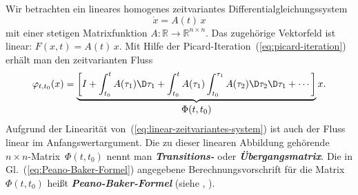 \begin{example}
Wir betrachten ein lineares homogenes zeitvariantes Differentialgleichungssystem
\begin{equation}
\dot{x}=A(t)\,x\label{eq:linear-zeitvariantes-system}
\end{equation}
mit einer stetigen Matrixfunktion $A:\mathbb{R}\to\mathbb{R}^{n\times n}$.
Das zugehörige Vektorfeld ist linear: $F(x,t)=A(t)\,x$. Mit Hilfe
der Picard-Iteration~(\ref{eq:picard-iteration}) erhält man den
zeitvarianten Fluss
\begin{equation}
\varphi_{t,t_{0}}(x)=\underbrace{\left[I+\int_{t_{0}}^{t}A(\tau_{1})\D\tau_{1}+\int_{t_{0}}^{t}A(\tau_{1})\int_{t_{0}}^{\tau_{1}}A(\tau_{2})\D\tau_{2}\D\tau_{1}+\cdots\right]}_{{\displaystyle \Phi(t,t_{0})}}x.\label{eq:Peano-Baker-Formel}
\end{equation}
Aufgrund der Linearität von~(\ref{eq:linear-zeitvariantes-system})
ist auch der Fluss linear im Anfangswertargument. Die zu dieser linearen
Abbildung gehörende $n\times n$-Matrix~$\Phi(t,t_{0})$ nennt man
\textbf{\em Transitions-} oder \textbf{\em Übergangsmatrix}.
Die in Gl.~(\ref{eq:Peano-Baker-Formel}) angegebene Berechnungsvorschrift
für die Matrix~$\Phi(t,t_{0})$ heißt \textbf{\em Peano-Baker-Formel}
(siehe \cite[Abschnitt~{15.5}]{gantmacher86}, \cite[S.~489]{sontag98}).
\end{example}


